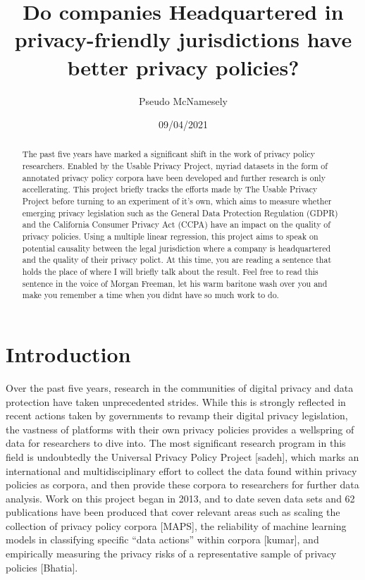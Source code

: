 \documentclass[
]{article}
\title{Do companies Headquartered in privacy-friendly jurisdictions have
better privacy policies?}
\author{Pseudo McNamesely}
\date{09/04/2021}
\begin{document}
\maketitle
\begin{abstract}
The past five years have marked a significant shift in the work of
privacy policy researchers. Enabled by the Usable Privacy Project,
myriad datasets in the form of annotated privacy policy corpora have
been developed and further research is only accellerating. This project
briefly tracks the efforts made by The Usable Privacy Project before
turning to an experiment of it's own, which aims to measure whether
emerging privacy legislation such as the General Data Protection
Regulation (GDPR) and the California Consumer Privacy Act (CCPA) have an
impact on the quality of privacy policies. Using a multiple linear
regression, this project aims to speak on potential causality between
the legal jurisdiction where a company is headquartered and the quality
of their privacy polict. At this time, you are reading a sentence that
holds the place of where I will briefly talk about the result. Feel free
to read this sentence in the voice of Morgan Freeman, let his warm
baritone wash over you and make you remember a time when you didnt have
so much work to do.
\end{abstract}

\hypertarget{introduction}{%
\section{Introduction}\label{introduction}}

Over the past five years, research in the communities of digital privacy
and data protection have taken unprecedented strides. While this is
strongly reflected in recent actions taken by governments to revamp
their digital privacy legislation, the vastness of platforms with their
own privacy policies provides a wellspring of data for researchers to
dive into. The most significant research program in this field is
undoubtedly the Universal Privacy Policy Project {[}sadeh{]}, which
marks an international and multidisciplinary effort to collect the data
found within privacy policies as corpora, and then provide these corpora
to researchers for further data analysis. Work on this project began in
2013, and to date seven data sets and 62 publications have been produced
that cover relevant areas such as scaling the collection of privacy
policy corpora {[}MAPS{]}, the reliability of machine learning models in
classifying specific ``data actions'' within corpora {[}kumar{]}, and
empirically measuring the privacy risks of a representative sample of
privacy policies {[}Bhatia{]}.
\end{document}
